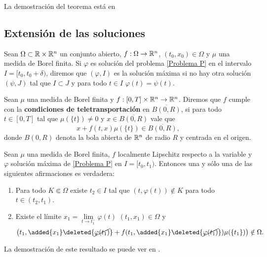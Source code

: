  La demostración del teorema está en \cite[Teorema 4.1]{P.Mazzone}
 
 \subsection{Extensión de las soluciones}


 
 \begin{defi} 
 	Sean $\Omega\subset\mathbb{R}\times\mathbb{R}^n$ un conjunto abierto, $f:\Omega\to\mathbb{R}^n$, $(t_0,x_0)\in\Omega$ y $\mu$ una medida de Borel finita. Si $\varphi$ es solución del problema \eqref{Problema P} en el intervalo $I=[t_0,t_0+\delta)$, diremos que $(\varphi,I)$ es la solución máxima si no hay otra solución $(\psi,J)$ tal que $I\subset J$ y para todo $t\in I$ $\varphi(t)=\psi(t)$.
 \end{defi}

 
 \begin{defi}  
 	Sean $\mu$ una medida de Borel finita y  $f:[0,T]\times\mathbb{R}^n\to\mathbb{R}^n$. Diremos que $f$ cumple con la \textbf{condiciones de teletransportación} en  $\overline{B(0,R)}$, si  para todo $t\in[0,T]$ tal que $\mu(\{t\})\neq0$ y $x\in\overline{ B(0,R)}$ vale que 
 	\begin{equation*}
 		x+f(t, x)\mu(\{t\}) \in \overline{B(0,R)}, \label{fun-tele}
 	\end{equation*}
 	donde $B(0,R)$ denota la bola abierta de $\mathbb{R}^n$ de radio $R$ y centrada en el origen.
 \end{defi}

\begin{thm}	\label{th:extensión}
	Sean $\mu$ una medida de Borel finita, $f$  localmente Lipschitz respecto a la  variable  y $\varphi$  solución máxima de \eqref{Problema P} en $I=[t_0,t_1)$. Entonces una y sólo una de las siguientes afirmaciones es verdadera: 
	\begin{enumerate}[label=\upshape(\Roman*)]
		\item  Para todo $K\Subset\Omega$ existe $t_2\in I$ tal que $(t,\varphi(t))\notin K$ para todo $t\in(t_2,t_1)$.
		\item Existe el límite $x_1=\lim\limits_{t\to t_1^-}\varphi(t)$   $(t_1,x_1)\in\Omega$ y 
		$$\left( t_1 ,\added{x_1}\deleted{\cancel{\varphi(t_1)}}+f(t_1,\added{x_1}\deleted{\cancel{\varphi(t_1)}})\mu(\{t_1\})\right) \notin \Omega.$$
	
	\end{enumerate}
\end{thm}
La demostración de este resultado se puede ver en \cite[Teorema 5.5]{P.Mazzone}.











